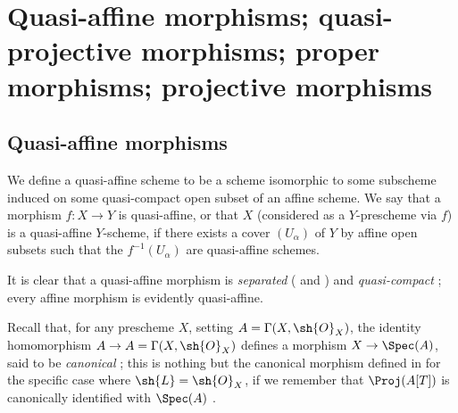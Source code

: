 \section{Quasi-affine morphisms; quasi-projective morphisms; proper morphisms; projective morphisms}
\label{section:II.5}

\subsection{Quasi-affine morphisms}
\label{subsection:II.5.1}

\begin{definition}[5.1.1]
\label{II.5.1.1}
We define a quasi-affine scheme to be a scheme isomorphic to some subscheme induced on some quasi-compact open subset of an affine scheme.
We say that a morphism $f:X\to Y$ is quasi-affine, or that $X$ (considered as a $Y$-prescheme via $f$) is a quasi-affine $Y$-scheme, if there exists a cover $(U_\alpha)$ of $Y$ by affine open subsets such that the $f^{-1}(U_\alpha)$ are quasi-affine schemes.
\end{definition}

It is clear that a quasi-affine morphism is \emph{separated} ( and ) and \emph{quasi-compact} ;
every affine morphism is evidently quasi-affine.

Recall that, for any prescheme $X$, setting $A=\Gamma(X,\sh{O}_X)$, the identity homomorphism $A\to A=\Gamma(X,\sh{O}_X)$ defines a morphism $X\to\Spec(A)$, said to be \emph{canonical} ;
this is nothing but the canonical morphism defined in  for the specific case where $\sh{L}=\sh{O}_X$, if we remember that $\Proj(A[T])$ is canonically identified with $\Spec(A)$ .


